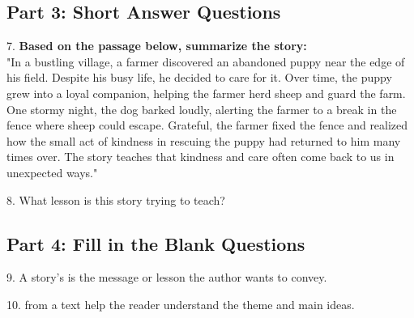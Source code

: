 \documentclass[12pt]{article}
\begin{document}
\newpage

\subsection*{Part 3: Short Answer Questions}

7. \textbf{Based on the passage below, summarize the story: }\\
"In a bustling village, a farmer discovered an abandoned puppy near the edge of his field. Despite his busy life, he decided to care for it. Over time, the puppy grew into a loyal companion, helping the farmer herd sheep and guard the farm. One stormy night, the dog barked loudly, alerting the farmer to a break in the fence where sheep could escape. Grateful, the farmer fixed the fence and realized how the small act of kindness in rescuing the puppy had returned to him many times over. The story teaches that kindness and care often come back to us in unexpected ways."\\
\vspace{3cm}

8. What lesson is this story trying to teach?\\
\vspace{4cm}

\subsection*{Part 4: Fill in the Blank Questions}

\vspace{1cm}
9. A story’s  \underline{\hspace{4cm}} is the message or lesson the author wants to convey.

\vspace{3cm}

10.  \underline{\hspace{4cm}}from a text help the reader understand the theme and main ideas.

\vspace{3cm}


\end{document}
